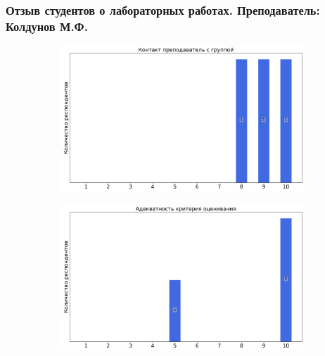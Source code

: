         \subsubsection{Отзыв студентов о лабораторных работах. Преподаватель: Колдунов М.Ф.}
            \begin{figure}[H]
                \centering
                \begin{subfigure}[b]{0.45\textwidth}
                    \centering
                    \includegraphics[width=\textwidth]{images/3 course/Общая физика - квантовая физика/labniks-marks-Колдунов М.Ф.-0.png}
                \end{subfigure}
                \begin{subfigure}[b]{0.45\textwidth}
                    \centering
                    \includegraphics[width=\textwidth]{images/3 course/Общая физика - квантовая физика/labniks-marks-Колдунов М.Ф.-1.png}
                \end{subfigure}
                \begin{subfigure}[b]{0.45\textwidth}

\end{subfigure}
\end{figure}
